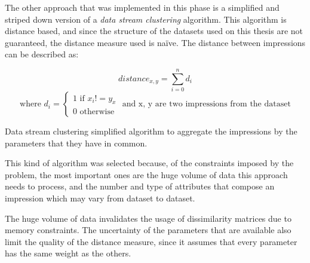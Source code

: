 The other approach that was implemented in this phase is a simplified and
striped down version of a \emph{data stream clustering} algorithm. This
algorithm is distance based, and since the structure of the datasets used on
this thesis are not guaranteed, the distance measure used is na\"{i}ve. The
distance between impressions can be described as:

\begin{center}
\begin{equation*}
  distance_{x,y}= \sum\limits_{i=0}^n d_i
\end{equation*}
\begin{equation*}
\text{where } d_i = \begin{cases} \text{1 if } x_i != y_x\\
\text{0 otherwise}\end{cases} \text{ and x, y are two impressions from the
dataset}
\end{equation*}
\end{center}

\begin{algorithm}
  \LinesNumbered
  \BlankLine

  \BlankLine

  \caption[Data stream clustering]{
    Data stream clustering simplified algorithm to aggregate the impressions by
    the parameters that they have in common.
  }
  \label{alg:pam} \end{algorithm}

This kind of algorithm was selected because, of the constraints imposed by the
problem, the most important ones are the huge volume of data this approach
needs to process, and the number and type of attributes that compose an
impression which may vary from dataset to dataset.

The huge volume of data invalidates the usage of
dissimilarity matrices due to memory constraints. The uncertainty of the
parameters that are available also limit the quality of the distance measure,
since it assumes that every parameter has the same weight as the others.

